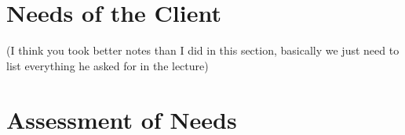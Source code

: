 \documentclass[
10pt, %
a4paper, %
oneside, %
headinclude,footinclude, %
BCOR5mm, %
]{scrartcl}
\begin{document}
\section{Needs of the Client}
(I think you took better notes than I did in this section, basically we just need to list everything he asked for in the lecture)
\section{Assessment of Needs}

\renewcommand{\refname}{\spacedlowsmallcaps{References}} %




\end{document}
